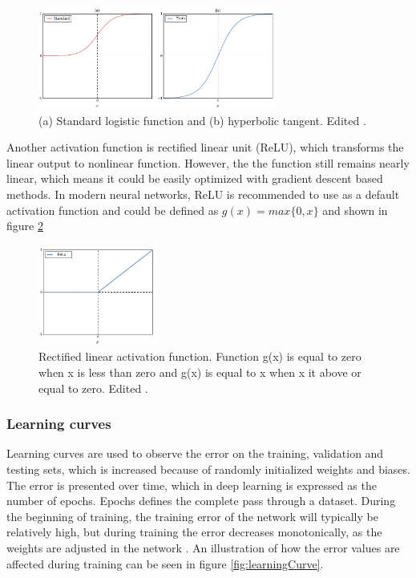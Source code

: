 \begin{figure} [H]
\centering
\includegraphics[width=0.7\textwidth]{figures/Sigmoids}
\caption{(a) Standard logistic function and (b) hyperbolic tangent. Edited \citep{Bengio2012}.}
\label{fig:Sigmoids}
\end{figure}

\noindent
Another activation function is rectified linear unit (ReLU), which transforms the linear output to nonlinear function. However, the the function still remains nearly linear, which means it could be easily optimized with gradient descent based methods\citep{Goodfellow2016}. In modern neural networks, ReLU is recommended to use as a default activation function and could be defined as $g(x) = max\{0, x\}$ and shown in figure \ref{fig:Relu}

\begin{figure} [H]
\centering
\includegraphics[width=0.35\textwidth]{figures/Relu}
\caption{Rectified linear activation function. Function g(x) is equal to zero when x is less than zero and g(x) is equal to x when x it above or equal to zero.
Edited \citep{Goodfellow2016}.}
\label{fig:Relu}
\end{figure}

\subsubsection{Learning curves}
Learning curves are used to observe the error on the training, validation and testing sets, which is increased because of randomly initialized weights and biases. The error is presented over time, which in deep learning is expressed as the number of epochs. Epochs defines the complete pass through a dataset.\citep{Duda2000}
During the beginning of training, the training error of the network will typically be relatively high, but during training the error decreases monotonically, as the weights are adjusted in the network \citep{Duda2000}. An illustration of how the error values are affected during training can be seen in figure \ref{fig:learningCurve}.

